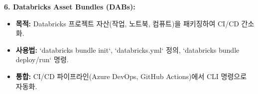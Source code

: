 \documentclass[11pt,a4paper]{article}
\begin{document}
\begin{tcolorbox}[colback=myblue!5!white, colframe=myblue!75!black, title=\textbf{CSCI103 Lecture 13 핵심 요약}]
\textbf{6. Databricks Asset Bundles (DABs):}
\begin{itemize}
    \item \textbf{목적:} Databricks 프로젝트 자산(작업, 노트북, 컴퓨트)을 패키징하여 CI/CD 간소화.
    \item \textbf{사용법:} `databricks bundle init`, `databricks.yml` 정의, `databricks bundle deploy/run` 명령.
    \item \textbf{통합:} CI/CD 파이프라인(Azure DevOps, GitHub Actions)에서 CLI 명령으로 자동화.
\end{itemize}
\end{tcolorbox}
\end{document}
